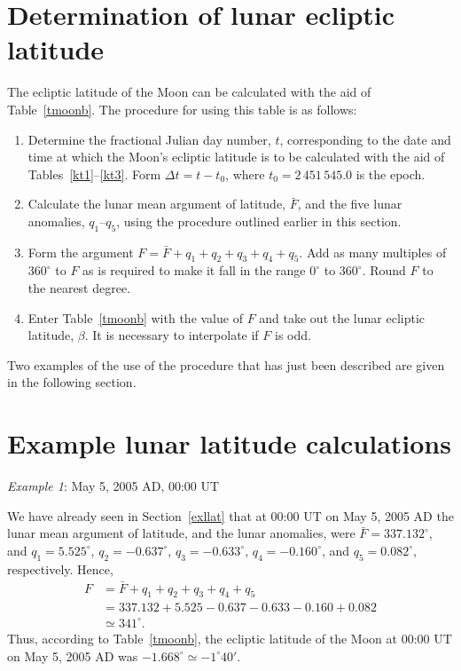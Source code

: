 \section{Determination of lunar ecliptic latitude}
The ecliptic latitude of the Moon can be calculated with the aid of Table~\ref{tmoonb}. The procedure for using this table is as follows:
\begin{enumerate}

 \item Determine the fractional Julian day number, $t$, corresponding to the date and time
at which the Moon's ecliptic latitude is to be calculated with the aid of Tables~\ref{kt1}--\ref{kt3}. Form $\Delta t = t-t_0$, where $t_0=2\,451\,545.0$ is the epoch. 

\item Calculate the lunar mean argument of latitude, $\bar{F}$, 
and the five lunar anomalies, $q_1$--$q_5$, using the procedure outlined earlier in this 
section.

\item Form the argument $F = \bar{F}+q_1+q_2+q_3+q_4+q_5$. Add as many multiples of $360^\circ$ to $F$ as is required to make it fall in the range
$0^\circ$ to $360^\circ$. Round $F$ to the nearest degree.

\item Enter Table~\ref{tmoonb} with the value of $F$
and take out the lunar ecliptic latitude, $\beta$. It is necessary to
interpolate if $F$ is odd.
\end{enumerate}

Two examples of the use of the procedure that has just been described are given in the following section.

\section{Example lunar latitude calculations}
\begin{center}
{\em Example 1}: May 5, 2005 AD, 00:00 UT
\end{center}
We have already seen in Section~\ref{exllat} that at 00:00 UT on May 5, 2005 AD
the lunar mean argument of latitude, and
the lunar anomalies, were $\bar{F}=337.132^\circ$, and
$q_1=5.525^\circ$, $q_2=-0.637^\circ$, $q_3=-0.633^\circ$, $q_4=-0.160^\circ$,
and $q_5=0.082^\circ$, respectively. Hence, 
\begin{align*}
F&=\bar{F}+q_1+q_2+q_3+q_4+q_5\\[0.5ex]
&=337.132+5.525-0.637-0.633-0.160+0.082\\[0.5ex]
&\simeq 341^\circ.
\end{align*} 
 Thus, according to Table~\ref{tmoonb}, the ecliptic latitude
of the Moon at  00:00 UT on May 5, 2005 AD was $-1.668^\circ\simeq -1^\circ 40'$.

